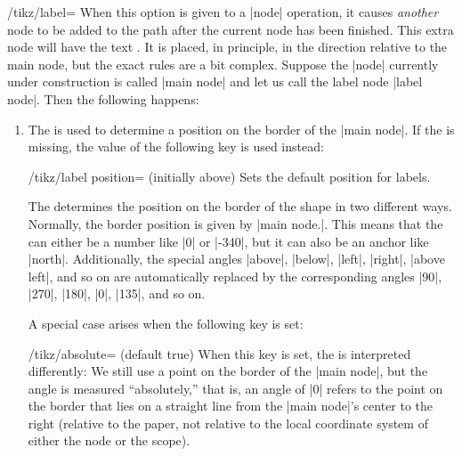 \begin{key}{/tikz/label=}
  \label{label-option}%
  When this option is given to a |node| operation, it causes
  \emph{another} node to be added to the path after the current node
  has been finished. This extra node will have the text
  . It is placed, in principle, in the direction
   relative to the main node, but the exact rules are a
  bit complex. Suppose the |node| currently under construction is called
  |main node| and let us call the label node |label node|. Then the
  following happens:
  \begin{enumerate}
  \item The  is used to determine a position on the border
    of the |main node|. If the  is missing, the value of
    the following key is used instead:
    \begin{key}{/tikz/label position= (initially above)}
      Sets the default position for labels.
    \end{key}
    The  determines the position on the border of the
    shape in two different ways. Normally, the border position is
    given by |main node.|. This means that the
     can either be a number like |0| or |-340|, but it can
    also be an anchor like |north|. Additionally, the special angles
    |above|, |below|, |left|, |right|, |above left|, and so on are
    automatically replaced by the corresponding angles |90|, |270|,
    |180|, |0|, |135|, and so on.

    A special case arises when the following key is set:
    \begin{key}{/tikz/absolute= (default true)}
      When this key is set, the  is interpreted
      differently: We still use a point on the border of the
      |main node|, but the angle is measured ``absolutely,'' that is,
      an angle of |0| refers to the point on the border that lies on a
      straight line from the |main node|'s center to the right
      (relative to the paper, not relative to the local coordinate
      system of either the node or the scope).


\end{key}
\end{enumerate}
\end{key}
